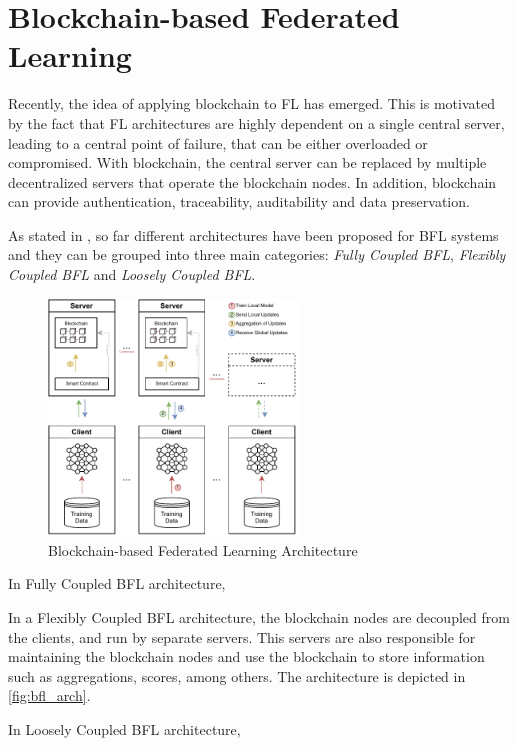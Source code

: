 \section{Blockchain-based Federated Learning}\label{background:bfl}

Recently, the idea of applying blockchain to FL has emerged. This is motivated by the fact that FL architectures are highly dependent on a single central server, leading to a central point of failure, that can be either overloaded or compromised. With blockchain, the central server can be replaced by multiple decentralized servers that operate the blockchain nodes. In addition, blockchain can provide authentication, traceability, auditability and data preservation.

As stated in \cite{10.48550/arxiv.2110.02182}, so far different architectures have been proposed for BFL systems and they can be grouped into three main categories: \textit{Fully Coupled BFL}, \textit{Flexibly Coupled BFL} and \textit{Loosely Coupled BFL}.

\begin{figure}[!ht]
    \centering
    \centering
    \includegraphics[width=0.6\textwidth]{graphics/bfl-architecture.pdf}
    \caption{Blockchain-based Federated Learning Architecture}
    \label{fig:bfl_arch}
\end{figure}

In Fully Coupled BFL architecture,

In a Flexibly Coupled BFL architecture, the blockchain nodes are decoupled from the clients, and run by separate servers. This servers are also responsible for maintaining the blockchain nodes and use the blockchain to store information such as aggregations, scores, among others. The architecture is depicted in \autoref{fig:bfl_arch}.

In Loosely Coupled BFL architecture,

